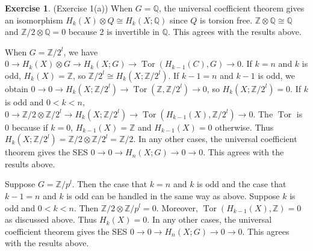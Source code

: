 \documentclass[12pt, psamsfonts]{amsart}
\theoremstyle{definition}
\newtheorem*{exer}{Exercise}
\theoremstyle{remark}
\DeclareMathOperator{\Tor}{Tor}
\numberwithin{equation}{section}
\begin{document}
\begin{exer}{(Exercise 1(a))}
  When $G = \mathbb{Q}$, the universal coefficient theorem gives an isomorphism $H_k(X) \otimes Q \cong H_k(X; \mathbb{Q})$ since $Q$ is torsion free.
  $\mathbb{Z} \otimes \mathbb{Q} \cong \mathbb{Q}$ and $\mathbb{Z} / 2 \otimes \mathbb{Q} = 0$ because 2 is invertible in $\mathbb{Q}$.
  This agrees with the results above.

  When $G = \mathbb{Z} / 2^l$, we have $0 \rightarrow H_k(X) \otimes G \rightarrow H_k(X; G) \rightarrow \Tor(H_{k - 1}(C), G) \rightarrow 0$.
  If $k = n$ and $k$ is odd, $H_k(X) = \mathbb{Z}$, so $\mathbb{Z} / 2^l \cong H_k(X; \mathbb{Z} / 2^l)$.
  If $k - 1 = n$ and $k - 1$ is odd, we obtain $0 \rightarrow 0 \rightarrow H_k(X; \mathbb{Z} / 2^l) \rightarrow \Tor(\mathbb{Z}, \mathbb{Z} / 2^l) \rightarrow 0$, so $H_k(X; \mathbb{Z} / 2^l) = 0$.
  If $k$ is odd and $0 < k < n$, $0 \rightarrow \mathbb{Z} / 2 \otimes \mathbb{Z} / 2^l \rightarrow H_k(X; \mathbb{Z} / 2^l) \rightarrow \Tor(H_{k - 1}(X), \mathbb{Z} / 2^l) \rightarrow 0$.
  The $\Tor$ is 0 because if $k = 0$, $H_{k - 1}(X) = \mathbb{Z}$ and $H_{k - 1}(X) = 0$ otherwise.
  Thus $H_k(X; \mathbb{Z} / 2^l) = \mathbb{Z} / 2 \otimes \mathbb{Z} / 2^l = \mathbb{Z} / 2$.
  In any other cases, the universal coefficient theorem gives the SES $0 \rightarrow 0 \rightarrow H_n(X; G) \rightarrow 0 \rightarrow 0$.
  This agrees with the results above.

  Suppose $G = \mathbb{Z} / p^l$.
  Then the case that $k = n$ and $k$ is odd and the case that $k - 1 = n$ and $k$ is odd can be handled in the same way as above.
  Suppose $k$ is odd and $0 < k < n$.
  Then $\mathbb{Z} / 2 \otimes \mathbb{Z} / p^l = 0$.
  Moreover, $\Tor(H_{k - 1}(X), \mathbb{Z}) = 0$ as discussed above.
  Thus $H_{k}(X) = 0$.
  In any other cases, the universal coefficient theorem gives the SES $0 \rightarrow 0 \rightarrow H_n(X; G) \rightarrow 0 \rightarrow 0$.
  This agrees with the results above.
\end{exer}
\end{document}
